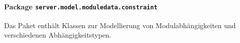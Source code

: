 \FloatBarrier
\paragraph[Package server.model.moduledata.constraint]{Package \texttt{server.model.moduledata.constraint}}
Das Paket enthält Klassen zur Modellierung von Modulabhängigkeiten und verschiedenen Abhängigkeitstypen.
       